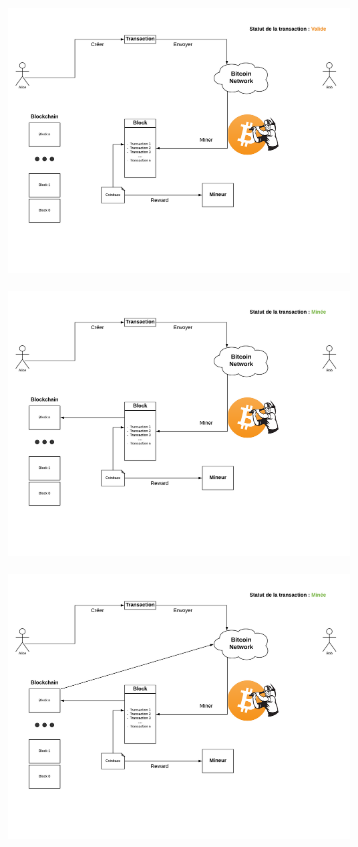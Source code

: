 \documentclass{beamer}
\begin{document}
\begin{frame}
    \begin{center}
        \includegraphics[height=7cm]{images/explanation-4.png}
    \end{center}
\end{frame}

\begin{frame}
    \begin{center}
        \includegraphics[height=7cm]{images/explanation-5.png}
    \end{center}
\end{frame}

\begin{frame}
    \begin{center}
        \includegraphics[height=7cm]{images/explanation-6.png}
    \end{center}
\end{frame}
\end{document}
